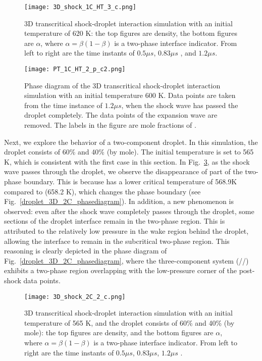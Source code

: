 \begin{figure}[htbp]
	\centering
	\texttt{[image: 3D\_shock\_1C\_HT\_3\_c.png]}
	\caption{3D transcritical shock-droplet interaction simulation with an initial temperature of 620 K: the top figures are density, the bottom figures are $\alpha$, where $\alpha = \beta (1-\beta)$ is a two-phase interface indicator. From left to right are the time instants of $0.5\mu s$, $0.83\mu s$ , and $1.2\mu s$.}
	\label{droplet_3d_1C_HT}
\end{figure}


\begin{figure}[htbp]
	\centering
	\texttt{[image: PT\_1C\_HT\_2\_p\_c2.png]}
	\caption{Phase diagram of the 3D transcritical shock-droplet interaction simulation with an initial temperature 600 K. Data points are taken from the time instance of $1.2\mu s$, when the shock wave has passed the droplet completely. The data points of the expansion wave are removed. The labels in the figure are mole fractions of .}
	\label{droplet_3D_1C_HT_phasediagram}
\end{figure}

Next, we explore the behavior of a two-component droplet. In this simulation, the droplet consists of 60\%  and 40\%  (by mole). The initial temperature is set to 565 K, which is consistent with the first case in this section. In Fig.~\ref{droplet_3d_2C}, as the shock wave passes through the droplet, we observe the disappearance of part of the two-phase boundary. This is because  has a lower critical temperature of 568.9K compared to  (658.2 K), which changes the phase boundary (see Fig.~\ref{droplet_3D_2C_phasediagram}). In addition, a new phenomenon is observed: even after the shock wave completely passes through the droplet, some sections of the droplet interface remain in the two-phase region. This is attributed to the relatively low pressure in the wake region behind the droplet, allowing the interface to remain in the subcritical two-phase region. This reasoning is clearly depicted in the phase diagram of Fig.~\ref{droplet_3D_2C_phasediagram}, where the three-component system (//) exhibits a two-phase region overlapping with the low-pressure corner of the post-shock data points.

\begin{figure}[htbp]
	\centering
	\texttt{[image: 3D\_shock\_2C\_2\_c.png]}
	\caption{3D transcritical shock-droplet interaction simulation with an initial temperature of 565 K, and the droplet consists of 60\%  and 40\%  (by mole): the top figures are density, and the bottom figures are $\alpha$, where $\alpha = \beta (1-\beta)$ is a two-phase interface indicator. From left to right are the time instants of $0.5\mu s$, $0.83\mu s$, $1.2\mu s$ .}
	\label{droplet_3d_2C}
\end{figure}

